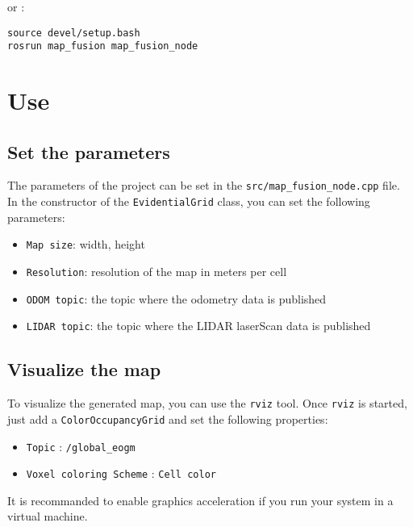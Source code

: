 or :

\begin{verbatim}
source devel/setup.bash
rosrun map_fusion map_fusion_node
\end{verbatim}

\section{Use}

\subsection{Set the parameters}

The parameters of the project can be set in the \texttt{src/map_fusion_node.cpp} file. In the constructor of the \texttt{EvidentialGrid} class, you can set the following parameters:

\begin{itemize}
    \item \texttt{Map size}: width, height
    \item \texttt{Resolution}: resolution of the map in meters per cell
    \item \texttt{ODOM topic}: the topic where the odometry data is published
    \item \texttt{LIDAR topic}: the topic where the LIDAR laserScan data is published
\end{itemize}

\subsection{Visualize the map}

To visualize the generated map, you can use the \texttt{rviz} tool. Once \texttt{rviz} is started, just add a \texttt{ColorOccupancyGrid} and set the following properties:

\begin{itemize}
    \item \texttt{Topic} : \texttt{/global\_eogm}
    \item \texttt{Voxel coloring Scheme} : \texttt{Cell color}
\end{itemize}

It is recommanded to enable graphics acceleration if you run your system in a virtual machine.